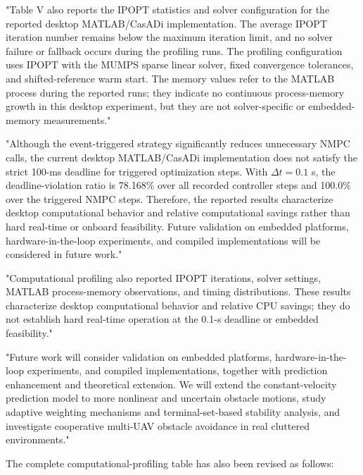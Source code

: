\documentclass[12pt, twosides]{article}
\theoremstyle{definition}
\begin{document}
"Table V also reports the IPOPT statistics and solver configuration for the reported desktop MATLAB/CasADi implementation. The average IPOPT iteration number remains below the maximum iteration limit, and no solver failure or fallback occurs during the profiling runs. The profiling configuration uses IPOPT with the MUMPS sparse linear solver, fixed convergence tolerances, and shifted-reference warm start. The memory values refer to the MATLAB process during the reported runs; they indicate no continuous process-memory growth in this desktop experiment, but they are not solver-specific or embedded-memory measurements."

"Although the event-triggered strategy significantly reduces unnecessary NMPC calls, the current desktop MATLAB/CasADi implementation does not satisfy the strict 100-ms deadline for triggered optimization steps. With $\Delta t=0.1$ s, the deadline-violation ratio is 78.168\% over all recorded controller steps and 100.0\% over the triggered NMPC steps. Therefore, the reported results characterize desktop computational behavior and relative computational savings rather than hard real-time or onboard feasibility. Future validation on embedded platforms, hardware-in-the-loop experiments, and compiled implementations will be considered in future work."

"Computational profiling also reported IPOPT iterations, solver settings, MATLAB process-memory observations, and timing distributions. These results characterize desktop computational behavior and relative CPU savings; they do not establish hard real-time operation at the 0.1-s deadline or embedded feasibility."

"Future work will consider validation on embedded platforms, hardware-in-the-loop experiments, and compiled implementations, together with prediction enhancement and theoretical extension. We will extend the constant-velocity prediction model to more nonlinear and uncertain obstacle motions, study adaptive weighting mechanisms and terminal-set-based stability analysis, and investigate cooperative multi-UAV obstacle avoidance in real cluttered environments."

The complete computational-profiling table has also been revised as follows:
\end{document}
